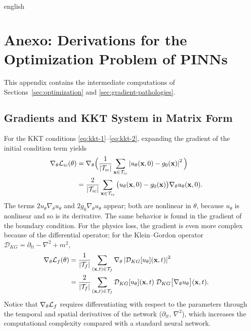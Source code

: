 \documentclass[../0000.tex]{subfiles}
\begin{document}

\begin{hyphenrules}{english}

\chapter{Anexo: Derivations for the Optimization Problem of PINNs}\label{app:optimization}

This appendix contains the intermediate computations of Sections~\ref{sec:optimization} and
\ref{sec:gradient-pathologies}.

\section{Gradients and KKT System in Matrix Form}\label{app-sec:kkt-gradients}

For the KKT conditions \eqref{eq:kkt-1}--\eqref{eq:kkt-2}, expanding the gradient of the initial
condition term yields
\begin{align}
  \nabla_\theta\mathcal{L}_{ic}(\theta)
  &=\nabla_\theta\Big(\frac{1}{\left\lvert \mathcal{T}_{ic} \right\rvert}\sum_{\mathbf{x}\in\mathcal{T}_{ic}}\left\lvert u_\theta(\mathbf{x},0)-g_0(\mathbf{x}) \right\rvert^2\Big) \label{eq:grad-ic-1}\\
  &=\frac{2}{\left\lvert \mathcal{T}_{ic} \right\rvert}\sum_{\mathbf{x}\in\mathcal{T}_{ic}}\big(u_\theta(\mathbf{x},0)-g_0(\mathbf{x})\big)\nabla_\theta u_\theta(\mathbf{x},0). \label{eq:grad-ic-2}
\end{align}
The terms $2u_\theta\nabla_\theta u_\theta$ and $2g_0\nabla_\theta u_\theta$ appear; both are nonlinear in
$\theta$, because $u_\theta$ is nonlinear and so is its derivative. The same behavior is found in the
gradient of the boundary condition. For the physics loss, the gradient is even more complex because of
the differential operator; for the Klein--Gordon operator
$\mathcal{D}_{KG}=\partial_{tt}-\nabla^2+m^2$,
\begin{align}
  \nabla_\theta\mathcal{L}_f(\theta)
  &=\frac{1}{\left\lvert \mathcal{T}_f \right\rvert}\sum_{(\mathbf{x},t)\in\mathcal{T}_f}\nabla_\theta\left\lvert \mathcal{D}_{KG}[u_\theta](\mathbf{x},t) \right\rvert^2 \label{eq:grad-f-1}\\
  &=\frac{2}{\left\lvert \mathcal{T}_f \right\rvert}\sum_{(\mathbf{x},t)\in\mathcal{T}_f}\mathcal{D}_{KG}[u_\theta](\mathbf{x},t)\;
    \mathcal{D}_{KG}\big[\nabla_\theta u_\theta\big](\mathbf{x},t). \label{eq:grad-f-2}
\end{align}
Notice that $\nabla_\theta\mathcal{L}_f$ requires differentiating with respect to the parameters through the
temporal and spatial derivatives of the network ($\partial_{tt}$, $\nabla^2$), which increases the
computational complexity compared with a standard neural network.


\end{hyphenrules}
\end{document}
